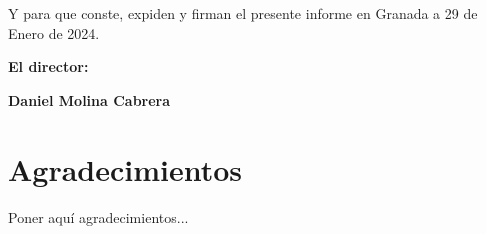 \vspace{0.5cm}

Y para que conste, expiden y firman el presente informe en Granada a 29 de Enero de 2024.

\vspace{1cm}

\textbf{El director:}

\vspace{5cm}

\noindent \textbf{Daniel Molina Cabrera}

\chapter*{Agradecimientos}
\thispagestyle{empty}

       \vspace{1cm}


Poner aquí agradecimientos...

